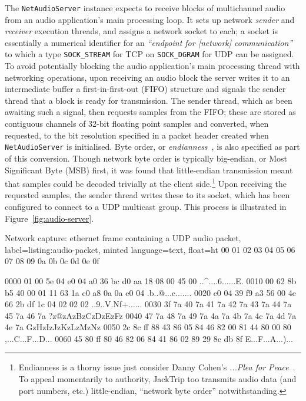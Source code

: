 \documentclass[utf8]{FrontiersinHarvard}
\newcommand{\figref}[1]{Figure~\ref{#1}}
\begin{document}
    The \texttt{NetAudioServer} instance expects to receive blocks of
    multichannel audio from an audio application's main processing loop.
    It sets up network \textit{sender} and \textit{receiver} execution threads, and
    assigns a network socket to each; a socket is essentially a numerical identifier
    for an
    \textit{``endpoint for [network] communication''}~\citep{kerrisk_socket2_2023}
    to which a type \textemdash{} \texttt{SOCK\_STREAM} for TCP on
    \texttt{SOCK\_DGRAM} for UDP \textemdash{} can be assigned.
    To avoid potentially blocking the audio application's main processing thread
    with networking operations, upon receiving an audio block the server writes it
    to an intermediate buffer \textemdash{} a first-in-first-out (FIFO) structure
    \textemdash{} and signals the sender thread that a block is ready for
    transmission.
    The sender thread, which as been awaiting such a signal, then requests samples
    from the FIFO; these are stored as contiguous channels of 32-bit floating point
    samples and converted, when requested, to the bit resolution specified in a
    packet header created when \texttt{NetAudioServer} is initialised.
    Byte order, or \textit{endianness}~\citep{cohen_holy_1981}, is also specified as
    part of this conversion.
    Though network byte order is typically big-endian, or Most Significant Byte
    (MSB) first, it was found that little-endian transmission meant that samples
    could be decoded trivially at the client side.\footnote{
        Endianness is a thorny issue \textemdash{} just consider Danny Cohen's
        \textit{...Plea for Peace}~\citep{cohen_holy_1981}.
        To appeal momentarily to authority, JackTrip too transmits audio data (and
        port numbers, etc.) little-endian, ``network byte order'' notwithstanding.
    }
    Upon receiving the requested samples, the sender thread writes these to its
    socket, which has been configured to connect to a UDP multicast group.
    This process is illustrated in \figref{fig:audio-server}.

    \begin{codelisting}{
        Network capture: ethernet frame containing a UDP audio packet,
        label=listing:audio-packet,
        minted language=text,
        float=ht
    }
       00 01 02 03 04 05 06 07  08 09 0a 0b 0c 0d 0e 0f

0000   01 00 5e 04 e0 04 a0 36  bc d0 aa 18 08 00 45 00   ..^....6......E.
0010   00 62 8b b5 40 00 01 11  63 1a c0 a8 0a 0a e0 04   .b..@...c.......
0020   e0 04 39 f9 a3 56 00 4e  66 2b df 1c 04 02 02 02   ..9..V.Nf+......
0030   3f 7a 40 7a 41 7a 42 7a  43 7a 44 7a 45 7a 46 7a   ?z@zAzBzCzDzEzFz
0040   47 7a 48 7a 49 7a 4a 7a  4b 7a 4c 7a 4d 7a 4e 7a   GzHzIzJzKzLzMzNz
0050   2c 8c ff 88 43 86 05 84  46 82 00 81 44 80 00 80   ,...C...F...D...
0060   45 80 ff 80 46 82 06 84  41 86 02 89 29 8c db 8f   E...F...A...)...
    \end{codelisting}
\end{document}
